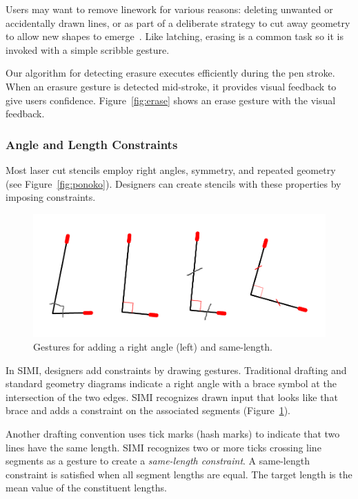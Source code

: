 \documentclass{article}
\begin{document}
Users may want to remove linework for various reasons: deleting
unwanted or accidentally drawn lines, or as part of a deliberate
strategy to cut away geometry to allow new shapes to
emerge~\cite{zeleznik-lineogrammer}. Like latching, erasing is a
common task so it is invoked with a simple scribble gesture. 

Our algorithm for detecting erasure executes efficiently during the
pen stroke. When an erasure gesture is detected mid-stroke, it
provides visual feedback to give users
confidence. Figure~\ref{fig:erase} shows an erase gesture with the
visual feedback.

\subsubsection{Angle and Length Constraints}

Most laser cut stencils employ right angles, symmetry, and repeated
geometry (see Figure~\ref{fig:ponoko}). Designers can create stencils
with these properties by imposing constraints.

\begin{figure}[h]
  \centering
  \includegraphics[width=0.9\linewidth]{img/constraints-all.pdf}
  \caption{Gestures for adding a right angle (left) and same-length.}
  \label{fig:constraints}
\end{figure}

In SIMI, designers add constraints by drawing gestures. Traditional
drafting and standard geometry diagrams indicate a right angle with a
brace symbol at the intersection of the two edges. SIMI recognizes
drawn input that looks like that brace and adds a constraint on the
associated segments (Figure~\ref{fig:constraints}).

Another drafting convention uses tick marks (hash marks) to indicate
that two lines have the same length. SIMI recognizes two or more ticks
crossing line segments as a gesture to create a \textit{same-length
  constraint}. A same-length constraint is satisfied when all segment
lengths are equal. The target length is the mean value of the
constituent lengths.
\end{document}
